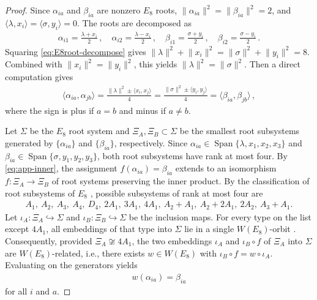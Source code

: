 \documentclass[10pt,a4paper]{amsart}
\begin{document}
\begin{proof}
    Since $ \alpha_{ia} $ and $ \beta_{ia} $ are nonzero $ E_8 $ roots, $ \lVert \alpha_{ia} \rVert^2 = \lVert \beta_{ia} \rVert^2 = 2 $, and  $ \langle \lambda, x_i \rangle = \langle \sigma, y_i \rangle = 0 $. The roots are decomposed as 
    \begin{align}\label{eq:E8root-decompose}
        \alpha_{i1} = \frac{\lambda+x_i}{2} \, , \quad
        \alpha_{i2} = \frac{\lambda-x_i}{2} \, , \quad
        \beta_{i1} = \frac{\sigma+y_i}{2} \, , \quad
        \beta_{i2} = \frac{\sigma-y_i}{2} \, .
    \end{align}
    Squaring \eqref{eq:E8root-decompose} gives $ \lVert \lambda \rVert^2 + \lVert x_i \rVert^2 = \lVert\sigma\rVert^2 + \lVert y_i \rVert^2 = 8 $. Combined with $ \lVert x_i \rVert^2 = \lVert y_i \rVert^2 $, this yields $ \lVert \lambda \rVert^2 = \lVert \sigma \rVert^2 $. Then a direct computation gives 
    \begin{align}\label{eq:app-inner}
       \langle \alpha_{ia}, \alpha_{jb} \rangle = \frac{\lVert \lambda \rVert^2 \pm \langle x_i, x_j \rangle}{4} = \frac{\lVert \sigma \rVert^2 \pm \langle y_i, y_j \rangle}{4} = \langle \beta_{ia}, \beta_{jb} \rangle \, ,
    \end{align}
    where the sign is plus if $ a=b $ and minus if $ a\neq b $. 

    Let $ \Sigma $ be the $ E_8 $ root system and $ \Xi_A, \Xi_B \subset \Sigma $ be the smallest root subsystems generated by $ \{\alpha_{ia}\} $ and $ \{\beta_{ia}\} $, respectively. Since $ \alpha_{ia} \in \operatorname{Span}\{\lambda, x_1, x_2, x_3 \} $ and $ \beta_{ia} \in \operatorname{Span}\{\sigma, y_1,y_2,y_3\} $, both root subsystems have rank at most four. By \eqref{eq:app-inner}, the assignment $ f(\alpha_{ia}) = \beta_{ia} $ extends to an isomorphism $ f : \Xi_A \to \Xi_B $ of root systems preserving the inner product. By the classification of root subsystems of $ E_8 $ \cite{Oshima:2007}, possible subsystems of rank at most four are
    \begin{align}
        A_1,\ A_2,\ A_3,\ A_4,\ D_4,\ 2A_1,\ 3A_1,\ 4A_1,\ A_2+A_1,\ A_2+2A_1,\ 2A_2,\ A_3+A_1 .
    \end{align}
    Let $ \iota_A : \Xi_A \hookrightarrow \Sigma $ and $ \iota_B : \Xi_B \hookrightarrow \Sigma $ be the inclusion maps. For every type on the list except $ 4A_1 $, all embeddings of that type into $ \Sigma $ lie in a single $ W(E_8) $-orbit \cite{Oshima:2007}. Consequently, provided $ \Xi_A \not\cong 4A_1 $, the two embeddings $ \iota_A $ and $ \iota_B \circ f $ of $ \Xi_A $ into $ \Sigma $ are $ W(E_8) $-related, i.e., there exists $ w \in W(E_8) $ with $ \iota_B \circ f = w \circ \iota_A $. Evaluating on the generators yields
    \begin{align}
        w(\alpha_{ia}) = \beta_{ia}
    \end{align}
    for all $ i $ and $ a $.


\end{proof}
\end{document}
